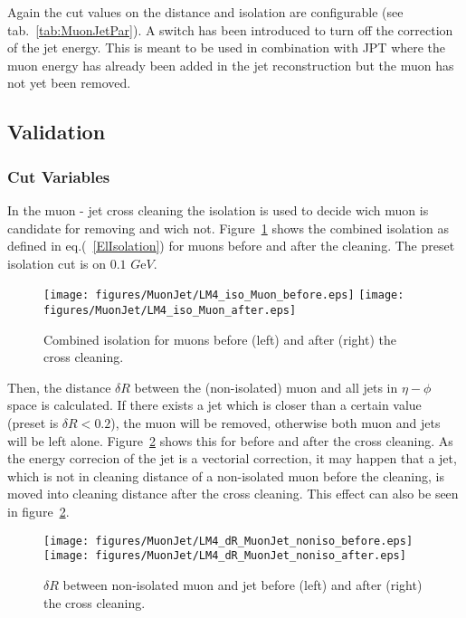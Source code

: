 \documentclass{cmspaper}
\begin{document}
Again the cut values on the distance and isolation are configurable (see
tab.~\ref{tab:MuonJetPar}). A switch has been introduced to turn off
the correction of the jet energy. This is meant to be used in combination with
JPT where the muon energy has already been added in the jet reconstruction but
the muon has not yet been removed.

\subsection{Validation}
\subsubsection{Cut Variables}
In the muon - jet cross cleaning the isolation is used to decide wich muon is candidate for removing and wich not. Figure~\ref{fig:MuonIsolation} shows the combined isolation as defined in eq.(~\ref{ElIsolation}) for muons before and after the cleaning. The preset isolation cut is on \(0.1\) \(G\)e\(V\). 


\begin{figure}[hb]
\begin{center}
    \texttt{[image: figures/MuonJet/LM4\_iso\_Muon\_before.eps]}
    \texttt{[image: figures/MuonJet/LM4\_iso\_Muon\_after.eps]}
    \caption{Combined isolation for muons before (left) and after (right) the cross cleaning.}
\label{fig:MuonIsolation}
\end{center}
\end{figure}


Then, the distance \(\delta R\) between the (non-isolated) muon and all jets in \(\eta - \phi\) space is calculated. If there exists a jet which is closer than a certain value (preset is \(\delta R < 0.2\)), the muon will be removed, otherwise both muon and jets will be left alone. Figure~\ref{fig:dR_MuonJet_noniso} shows this for before and after the cross cleaning. As the energy correcion of the jet is a vectorial correction, it may happen that a jet, which is not in cleaning distance of a non-isolated muon before the cleaning, is moved into cleaning distance after the cross cleaning. This effect can also be seen in figure~\ref{fig:dR_MuonJet_noniso}.

\begin{figure}[hb]
\begin{center}
    \texttt{[image: figures/MuonJet/LM4\_dR\_MuonJet\_noniso\_before.eps]}
    \texttt{[image: figures/MuonJet/LM4\_dR\_MuonJet\_noniso\_after.eps]}
    \caption{\(\delta R\) between non-isolated muon and jet before (left) and after (right) the cross cleaning.}
\label{fig:dR_MuonJet_noniso}
\end{center}
\end{figure}
\end{document}

